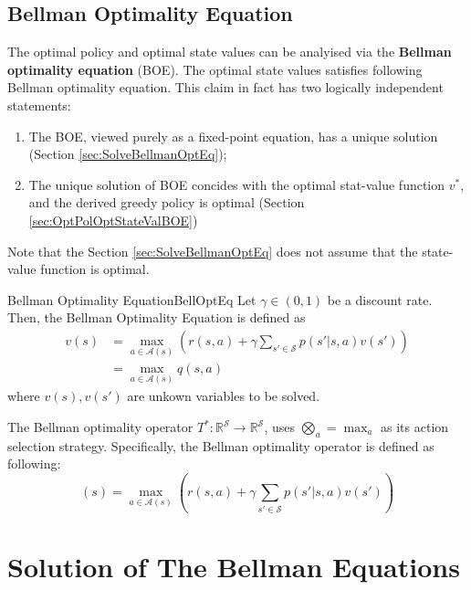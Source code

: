     \subsection{Bellman Optimality Equation}
        The optimal policy and optimal state values can be analyised via the \textbf{Bellman optimality equation} (BOE).
        The optimal state values satisfies following Bellman optimality equation. This claim in fact has two logically independent statements:
        \begin{enumerate}
            \item The BOE, viewed purely as a fixed-point equation, has a unique solution (Section \ref{sec:SolveBellmanOptEq});
            \item The unique solution of BOE concides with the optimal stat-value function $v^*$, and the derived greedy policy is optimal (Section \ref{sec:OptPolOptStateValBOE})
        \end{enumerate}
        Note that the Section \ref{sec:SolveBellmanOptEq} does not assume that the state-value function is optimal.
        \begin{defn}{Bellman Optimality Equation}{BellOptEq}
            Let $\gamma \in (0,1)$ be a discount rate. Then, the Bellman Optimality Equation is defined as
            \begin{align}
                v(s) &= \max_{a \in \mathcal{A}(s)}\left( r(s,a) + \gamma \sum_{s' \in \mathcal{S}}p(s'|s,a)v(s') \right) \\
                    &= \max_{a \in \mathcal{A}(s)} q(s,a)
            \end{align}
            where $v(s),v(s')$ are unkown variables to be solved.

            The Bellman optimality operator $T^*:\mathbb{R}^\mathcal{S} \to \mathbb{R}^\mathcal{S}$, uses $\bigotimes_a = \max_a$ as its action selection strategy.
            Specifically, the Bellman optimality operator is defined as following:
            \begin{equation}
                [T^* v](s) = \max_{a \in \mathcal{A}(s)}\left( r(s, a) + \gamma \sum_{s' \in \mathcal{S}}p(s'|s,a)v(s') \right)
            \end{equation}
        \end{defn}
        
\section{Solution of The Bellman Equations}
